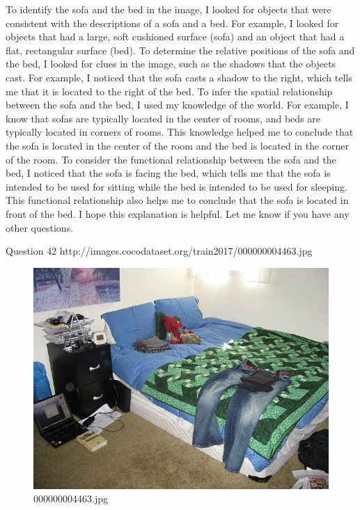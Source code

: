 \begin{enumerate}
    To identify the sofa and the bed in the image, I looked for objects that were consistent with the descriptions of a sofa and a bed. For example, I looked for objects that had a large, soft cushioned surface (sofa) and an object that had a flat, rectangular surface (bed).
    To determine the relative positions of the sofa and the bed, I looked for clues in the image, such as the shadows that the objects cast. For example, I noticed that the sofa casts a shadow to the right, which tells me that it is located to the right of the bed.
    To infer the spatial relationship between the sofa and the bed, I used my knowledge of the world. For example, I know that sofas are typically located in the center of rooms, and beds are typically located in corners of rooms. This knowledge helped me to conclude that the sofa is located in the center of the room and the bed is located in the corner of the room.
    To consider the functional relationship between the sofa and the bed, I noticed that the sofa is facing the bed, which tells me that the sofa is intended to be used for sitting while the bed is intended to be used for sleeping. This functional relationship also helps me to conclude that the sofa is located in front of the bed.
    I hope this explanation is helpful. Let me know if you have any other questions.
\end{enumerate}
Question 42
http://images.cocodataset.org/train2017/000000004463.jpg
\begin{figure}[h]
    \centering
    \includegraphics[width=0.8\linewidth]{../image set/hard/000000004463.jpg}
    \caption{000000004463.jpg}
\end{figure}
